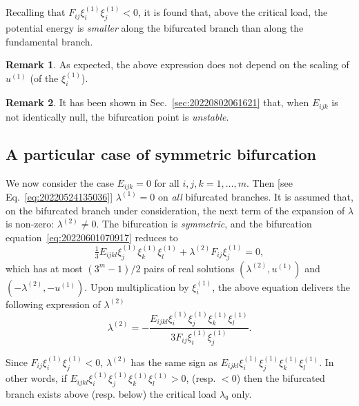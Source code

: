 \documentclass[12pt, final]{scrartcl}
\theoremstyle{definition}
\newtheorem{remark}{Remark}
\newcommand{\order}[2][1]{#2^{(#1)}}
\begin{document}
Recalling that $F_{i j} \order[1]{ξ_i} \order[1]{ξ_j} < 0$, it is found that, above the critical
load, the potential energy is \emph{smaller} along the bifurcated branch than
along the fundamental branch.

\begin{remark}
  As expected, the above expression does not depend on the scaling of $\order[1]u$ (of the $\order[1]{ξ_i}$).
\end{remark}
\begin{remark}
  It has been shown in Sec.~\ref{sec:20220802061621} that, when $E_{ijk}$ is
  not identically null, the bifurcation point is \emph{unstable}.
\end{remark}

\subsection{A particular case of symmetric bifurcation}

We now consider the case $E_{ijk}=0$ for all $i, j, k = 1, \ldots, m$. Then
[see Eq.~\eqref{eq:20220524135036}] $\order[1]\lambda = 0$ on \emph{all} bifurcated
branches. It is assumed that, on the bifurcated branch under consideration, the
next term of the expansion of $\lambda$ is non-zero: $\order[2]\lambda ≠ 0$. The bifurcation is
\emph{symmetric}, and the bifurcation equation~\eqref{eq:20220601070917} reduces
to
\begin{equation}
  \label{eq:20220801092222}
  \tfrac{1}{3} E_{ijkl} \order[1]{ξ_j} \order[1]{ξ_k} \order[1]{ξ_l}  + \order[2]\lambda F_{ij} \order[1]{ξ_j} = 0,
\end{equation}
which has at most $(3^m - 1) / 2$ pairs of real solutions $(\order[2]\lambda, \order[1]u)$ and
$(- \order[2]\lambda, - \order[1]u)$. Upon multiplication by $\order[1]{ξ_i}$, the above equation delivers
the following expression of $\order[2]\lambda$
\begin{equation}
  \label{eq:20220801093236}
  \order[2]\lambda = -\frac{E_{ijkl} \order[1]{ξ_i} \order[1]{ξ_j} \order[1]{ξ_k} \order[1]{ξ_l}}{3 F_{ij} \order[1]{ξ_i} \order[1]{ξ_j}}.
\end{equation}

Since $F_{ij} \order[1]{ξ_i} \order[1]{ξ_j} < 0$, $\order[2]\lambda$ has the same sign as
$E_{ijkl}\order[1]{ξ_i} \order[1]{ξ_j} \order[1]{ξ_k} \order[1]{ξ_l}$. In other words, if
$E_{ijkl}\order[1]{ξ_i} \order[1]{ξ_j} \order[1]{ξ_k} \order[1]{ξ_l} > 0$, (resp. $<0$) then the bifurcated branch
exists above (resp. below) the critical load $\lambda₀$ only.
\end{document}
